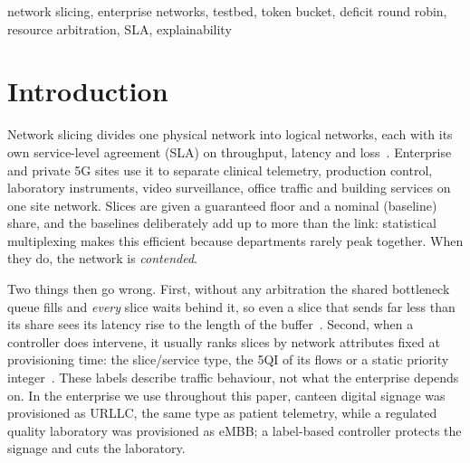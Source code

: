 \documentclass[conference]{IEEEtran}
\begin{document}
\begin{IEEEkeywords}
network slicing, enterprise networks, testbed, token bucket, deficit round robin, resource arbitration, SLA, explainability
\end{IEEEkeywords}

\section{Introduction}

Network slicing divides one physical network into logical networks, each with its own service-level agreement (SLA) on throughput, latency and loss~\cite{ngmn2015,foukas2017,afolabi2018}. Enterprise and private 5G sites use it to separate clinical telemetry, production control, laboratory instruments, video surveillance, office traffic and building services on one site network. Slices are given a guaranteed floor and a nominal (baseline) share, and the baselines deliberately add up to more than the link: statistical multiplexing makes this efficient because departments rarely peak together. When they do, the network is \emph{contended}.

Two things then go wrong. First, without any arbitration the shared bottleneck queue fills and \emph{every} slice waits behind it, so even a slice that sends far less than its share sees its latency rise to the length of the buffer~\cite{gettys2012}. Second, when a controller does intervene, it usually ranks slices by network attributes fixed at provisioning time: the slice/service type, the 5QI of its flows or a static priority integer~\cite{3gpp23501,3gpp23503}. These labels describe traffic behaviour, not what the enterprise depends on. In the enterprise we use throughout this paper, canteen digital signage was provisioned as URLLC, the same type as patient telemetry, while a regulated quality laboratory was provisioned as eMBB; a label-based controller protects the signage and cuts the laboratory.
\end{document}
